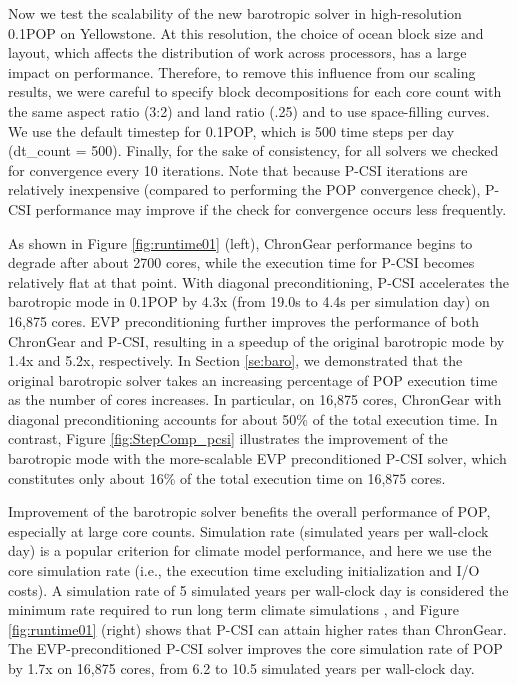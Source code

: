 Now we test the scalability of the new barotropic solver in
high-resolution 0.1\degree\space POP on Yellowstone.  At this resolution,
the choice of ocean block size and layout, which affects the
distribution of work across processors, has a large impact on
performance.  Therefore, to remove this influence from our scaling
results, we were careful to specify block decompositions for each core
count with the same aspect ratio (3:2) and land ratio (.25) and to use
space-filling curves.  We use the default timestep for
0.1\degree\space POP, which is 500 time steps per day (dt\_count = 500).
Finally, for the sake of consistency, for all solvers we checked for convergence every 10 iterations.
Note that because P-CSI iterations are relatively inexpensive
(compared to performing the POP  convergence check), 
P-CSI performance may improve if the check for convergence occurs less frequently.


As shown in Figure \ref{fig:runtime01} (left),
ChronGear performance begins to degrade after about 2700 cores,
while the execution time for P-CSI becomes relatively flat at that
point. With diagonal preconditioning, P-CSI accelerates the barotropic
mode in 0.1\degree\space POP by 4.3x (from 19.0s to 4.4s per simulation
day) on 16,875 cores.  EVP preconditioning further improves the
performance of both ChronGear and P-CSI, resulting in a speedup of the
original barotropic mode by 1.4x and 5.2x, respectively.
In Section \ref{se:baro}, we demonstrated that the original barotropic
solver takes an increasing percentage of POP execution time as the
number of cores increases. In particular, on 16,875 cores, ChronGear
with diagonal preconditioning accounts for about 50\% of the total
execution time.  In contrast, Figure \ref{fig:StepComp_pcsi}
illustrates the improvement of the barotropic mode with the more-scalable EVP preconditioned
P-CSI solver, which constitutes only about 16\% of the total execution
time on 16,875 cores. 


Improvement of the barotropic solver benefits the
overall performance of POP, especially at large core counts. 
Simulation rate (simulated years per wall-clock day) is a popular
criterion for climate model performance, and here we use the core
simulation rate (i.e., the execution time excluding initialization and I/O costs).
A simulation rate of 5 simulated years per wall-clock day is considered
the minimum rate required to run long term climate simulations
\cite{dennis2012computational}, and Figure \ref{fig:runtime01} (right)
shows that P-CSI can attain higher rates than ChronGear.
The EVP-preconditioned P-CSI solver improves the core simulation rate of
POP by 1.7x on 16,875 cores, from 6.2 to 10.5 simulated years per wall-clock day.

